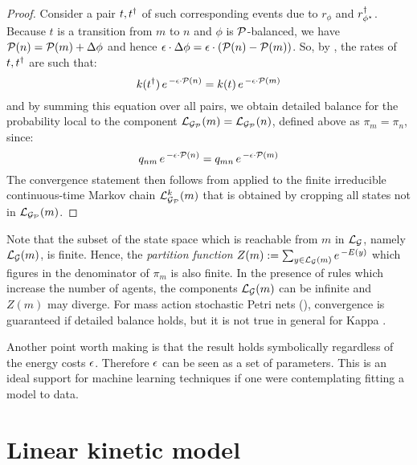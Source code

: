 \begin{proof}
  Consider a pair $t,t^\dagger$ of such corresponding events
  due to $r_\phi$ and $r^\dagger_{\phi^\star}$.
  Because $t$ is a transition from $m$ to $n$
  and $\phi$ is $\mathcal{P}$-balanced, %
  we have $\mathcal{P}(n) = \mathcal{P}(m) + \Delta\phi$
  and hence
  $\epsilon \cdot \Delta\phi = \epsilon \cdot (\mathcal{P}(n)-\mathcal{P}(m))$.
  So, by , the rates of $t,t^\dagger$ are such that:
  \begin{equation*}
    k(t^\dagger)\, e^{\,-\epsilon \cdot \mathcal{P}(n)} =
    k(t)\, e^{\,-\epsilon \cdot \mathcal{P}(m)}
  \end{equation*}
  and by summing this equation over all pairs,
  we obtain detailed balance
  for the probability local to the component
  $\mathcal{L}_{\mathcal{G}_{\mathcal{P}}}(m) = \mathcal{L}_{\mathcal{G}_{\mathcal{P}}}(n)$,
  defined above as $\pi_m = \pi_n$, since:
  \begin{equation*}
    q_{nm}\, e^{\,-\epsilon \cdot \mathcal{P}(n)} =
    q_{mn}\, e^{\,-\epsilon \cdot \mathcal{P}(m)}
  \end{equation*}
  The convergence statement then follows from 
  applied to the finite irreducible continuous-time Markov chain
  $\mathcal{L}^k_{\mathcal{G}_{\mathcal{P}}}(m)$
  that is obtained by cropping all states
  not in $\mathcal{L}_{\mathcal{G}_{\mathcal{P}}}(m)$.
\end{proof}

Note that the subset of the state space
which is reachable from $m$ in $\mathcal{L}_{\mathcal{G}}$,
namely $\mathcal{L}_{\mathcal{G}}(m)$, is finite.
Hence, the \emph{partition function}
$Z(m) := \sum_{y \in \mathcal{L}_{\mathcal{G}}(m)} e^{\,-E(y)}$
which figures in the denominator of $\pi_m$ is also finite.
In the presence of rules which increase the number of agents,
the components $\mathcal{L}_{\mathcal{G}}(m)$ can be infinite
and $Z(m)$ may diverge.
For mass action stochastic Petri nets (),
convergence is guaranteed if detailed balance holds,
but it is not true in general for Kappa \citep{et2,et1}.

Another point worth making is that the result holds symbolically %
regardless of the energy costs $\epsilon$.
Therefore $\epsilon$ can be seen as a set of parameters.
This is an ideal support for machine learning techniques
if one were contemplating fitting a model to data.


\section{Linear kinetic model}
\label{sec:lkm}

